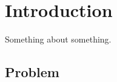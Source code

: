 \section{Introduction}
Something about something.
\subsection{Problem}
\newpage
\begin{comment}
\begin{figure}[H]
  \texttt{[image: illustrations/UseCase\_ver1.png]}
  \caption{Usecase version 1.1}
  \label{dailyscrum}
\end{figure}
\begin{figure}[H]
  \texttt{[image: illustrations/UseCase\_ver2.png]}
  \caption{Usecase version 2.0}
  \label{burndown}
\end{figure}
\end{comment}

